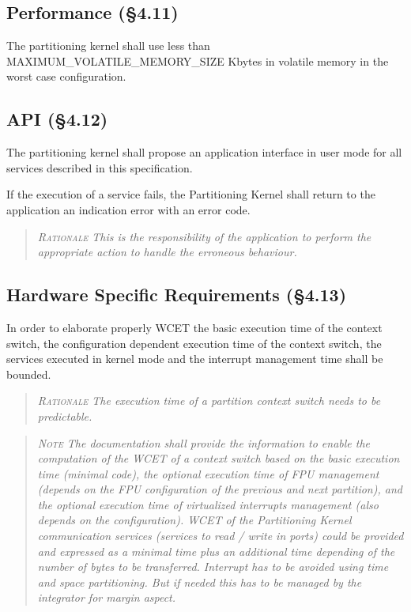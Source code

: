 \subsection{Performance (\S4.11)}

The partitioning kernel shall use less than MAXIMUM\_VOLATILE\_MEMORY\_SIZE Kbytes in volatile memory in the worst case configuration.

\subsection{API (\S4.12)}

The partitioning kernel shall propose an application interface in user mode for all services described in this specification.

If the execution of a service fails, the Partitioning Kernel shall return to the application an indication error with an error code.
\begin{quote}\it
\textsc{Rationale}
This is the responsibility of the application to perform the appropriate action to handle the erroneous behaviour.
\end{quote}

\subsection{Hardware Specific Requirements (\S4.13)}

In order to elaborate properly WCET the basic execution time of the context switch, the configuration dependent execution time of the context switch, the services executed in kernel mode and the interrupt management time shall be bounded.
\begin{quote}\it
\textsc{Rationale}
The execution time of a partition context switch needs to be predictable.
\end{quote}
\begin{quote}\it
\textsc{Note}
The documentation shall provide the information to enable the computation of the WCET of a context switch based on the basic execution time (minimal code), the optional execution time of FPU management (depends on the FPU configuration of the previous and next partition), and the optional execution time of virtualized interrupts management (also depends on the configuration). WCET of the Partitioning Kernel communication services (services to read / write in ports) could be provided and expressed as a minimal time plus an additional time depending of the number of bytes to be transferred.
Interrupt has to be avoided using time and space partitioning. But if needed this has to be managed by the integrator for margin aspect.
\end{quote}

